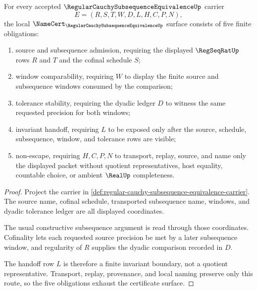 \begin{theorem}
\label{thm:regular-cauchy-subsequence-equivalence-namecert-obligations}
For every accepted $\RegularCauchySubsequenceEquivalenceUp$ carrier
$$
E=(R,S,T,W,D,L,H,C,P,N),
$$
the local $\NameCert_{\RegularCauchySubsequenceEquivalenceUp}$ surface consists of five finite obligations:
\begin{enumerate}
\item source and subsequence admission, requiring the displayed $\RegSeqRatUp$ rows $R$ and $T$ and the cofinal schedule $S$;
\item window comparability, requiring $W$ to display the finite source and subsequence windows consumed by the comparison;
\item tolerance stability, requiring the dyadic ledger $D$ to witness the same requested precision for both windows;
\item invariant handoff, requiring $L$ to be exposed only after the source, schedule, subsequence, window, and tolerance rows are visible;
\item non-escape, requiring $H,C,P,N$ to transport, replay, source, and name only the displayed packet without quotient representatives, host equality, countable choice, or ambient $\RealUp$ completeness.
\end{enumerate}
\end{theorem}
\begin{proof}
Project the carrier in \autoref{def:regular-cauchy-subsequence-equivalence-carrier}. The source name, cofinal schedule, transported subsequence name, windows, and dyadic tolerance ledger are all displayed coordinates.

The usual constructive subsequence argument is read through those coordinates. Cofinality lets each requested source precision be met by a later subsequence window, and regularity of $R$ supplies the dyadic comparison recorded in $D$.

The handoff row $L$ is therefore a finite invariant boundary, not a quotient representative. Transport, replay, provenance, and local naming preserve only this route, so the five obligations exhaust the certificate surface.
\end{proof}

